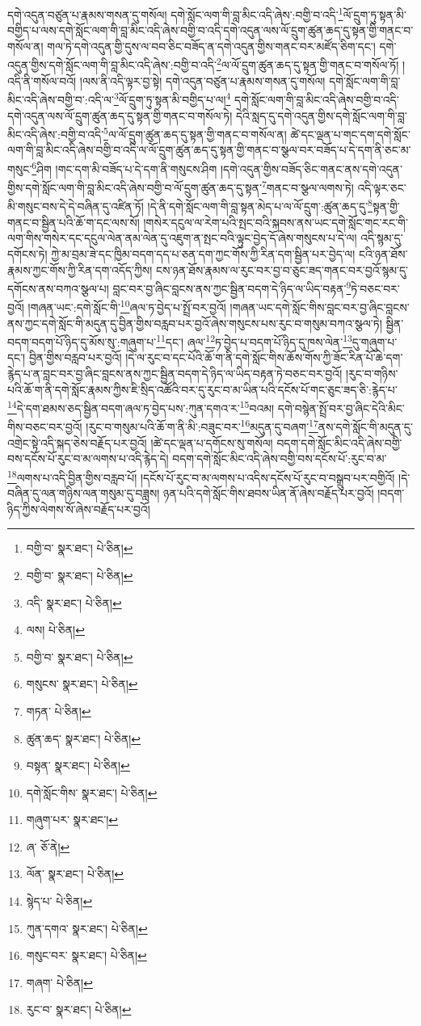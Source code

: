 དགེ་འདུན་བཙུན་པ་རྣམས་གསན་དུ་གསོལ། དགེ་སློང་ལག་གི་བླ་མིང་འདི་ཞེས་:བགྱི་བ་འདི་\footnote{བགྱི་བ་  སྣར་ཐང་།  པེ་ཅིན། }ལོ་དྲུག་ཏུ་སྟན་མི་བགྱིད་པ་ལས་དགེ་སློང་ལག་གི་བླ་མིང་འདི་ཞེས་བགྱི་བ་འདི་དགེ་འདུན་ལས་ལོ་དྲུག་ཚུན་ཆད་དུ་སྟན་གྱི་གནང་བ་གསོལ་ན། གལ་ཏེ་དགེ་འདུན་གྱི་དུས་ལ་བབ་ཅིང་བཟོད་ན་དགེ་འདུན་གྱིས་གནང་བར་མཛོད་ཅིག་དང་། དགེ་འདུན་གྱིས་དགེ་སློང་ལག་གི་བླ་མིང་འདི་ཞེས་:བགྱི་བ་འདི་\footnote{བགྱི་བ་  སྣར་ཐང་།  པེ་ཅིན། }ལ་ལོ་དྲུག་ཚུན་ཆད་དུ་སྟན་གྱི་གནང་བ་གསོལ་ཏོ། །འདི་ནི་གསོལ་བའོ། །ལས་ནི་འདི་ལྟར་བྱ་སྟེ། དགེ་འདུན་བཙུན་པ་རྣམས་གསན་དུ་གསོལ། དགེ་སློང་ལག་གི་བླ་མིང་འདི་ཞེས་བགྱི་བ་:འདི་ལ་\footnote{འདི་  སྣར་ཐང་།  པེ་ཅིན། }ལོ་དྲུག་ཏུ་སྟན་མི་བགྱིད་པ་ལ།\footnote{ལས།  པེ་ཅིན། } དགེ་སློང་ལག་གི་བླ་མིང་འདི་ཞེས་བགྱི་བ་འདི་དགེ་འདུན་ལས་ལོ་དྲུག་ཚུན་ཆད་དུ་སྟན་གྱི་གནང་བ་གསོལ་ཏེ། དེའི་སླད་དུ་དགེ་འདུན་གྱིས་དགེ་སློང་ལག་གི་བླ་མིང་འདི་ཞེས་:བགྱི་བ་འདི་\footnote{བགྱི་བ་  སྣར་ཐང་།  པེ་ཅིན། }ལ་ལོ་དྲུག་ཚུན་ཆད་དུ་སྟན་གྱི་གནང་བ་གསོལ་ན། ཚེ་དང་ལྡན་པ་གང་དག་དགེ་སློང་ལག་གི་བླ་མིང་འདི་ཞེས་བགྱི་བ་འདི་ལ་ལོ་དྲུག་ཚུན་ཆད་དུ་སྟན་གྱི་གནང་བ་སྩལ་བར་བཟོད་པ་དེ་དག་ནི་ཅང་མ་གསུང་\footnote{གསུངས་  སྣར་ཐང་།  པེ་ཅིན། }ཤིག །གང་དག་མི་བཟོད་པ་དེ་དག་ནི་གསུངས་ཤིག །དགེ་འདུན་གྱིས་བཟོད་ཅིང་གནང་ནས་དགེ་འདུན་གྱིས་དགེ་སློང་ལག་གི་བླ་མིང་འདི་ཞེས་བགྱི་བ་ལོ་དྲུག་ཚུན་ཆད་དུ་སྟན་\footnote{གཏན་  པེ་ཅིན། }གནང་བ་སྩལ་ལགས་ཏེ། འདི་ལྟར་ཅང་མི་གསུང་བས་དེ་དེ་བཞིན་དུ་འཛིན་ཏོ། །དེ་ནི་དགེ་སློང་ལག་གི་བླ་སྟན་མེད་པ་ལ་ལོ་དྲུག་:ཚུན་ཆད་དུ་\footnote{ཚུན་ཆད་  སྣར་ཐང་།  པེ་ཅིན། }སྟན་གྱི་གནང་བ་སྦྱིན་པའི་ཆོ་ག་དང་ལས་སོ། །གསེར་དངུལ་ལ་རེག་པའི་སྤང་བའི་སྐབས་ནས་ཡང་དགེ་སློང་གང་རང་གི་ལག་གིས་གསེར་དང་དངུལ་ལེན་ནམ་ལེན་དུ་འཇུག་ན་སྤང་བའི་ལྟུང་བྱེད་དོ་ཞེས་གསུངས་པ་དེ་ལ། འདི་སྙམ་དུ་དགོངས་ཏེ། ཀྱེ་མ་བྲམ་ཟེ་དང་ཁྱིམ་བདག་དད་པ་ཅན་དག་ཀྱང་གོས་ཀྱི་རིན་དག་སྦྱིན་པར་བྱེད་ལ། ངའི་ཉན་ཐོས་རྣམས་ཀྱང་གོས་ཀྱི་རིན་དག་འདོད་ཀྱིས། ངས་ཉན་ཐོས་རྣམས་ལ་རུང་བར་བྱ་བ་ཅུང་ཟད་གནང་བར་བྱའོ་སྙམ་དུ་དགོངས་ནས་བཀའ་སྩལ་པ། བླང་བར་བྱ་ཞིང་བླངས་ནས་ཀྱང་སྦྱིན་བདག་དེ་ཉིད་ལ་ཡིད་བརྟན་\footnote{བསྟན་  སྣར་ཐང་།  པེ་ཅིན། }ཏེ་བཅང་བར་བྱའོ། །གཞན་ཡང་:དགེ་སློང་གི་\footnote{དགེ་སློང་གིས་  སྣར་ཐང་།  པེ་ཅིན། }ཞལ་ཏ་བྱེད་པ་སྤྲོ་བར་བྱའོ། །གཞན་ཡང་དགེ་སློང་གིས་བླང་བར་བྱ་ཞིང་བླངས་ནས་ཀྱང་དགེ་སློང་གི་མདུན་དུ་བྱིན་གྱིས་བརླབ་པར་བྱའོ་ཞེས་གསུངས་པས་རུང་བ་གསུམ་བཀའ་སྩལ་ཏེ། སྦྱིན་བདག་བདག་པོ་ཉིད་དུ་མོས་སུ་:གཞུག་པ་\footnote{གཞུག་པར་  སྣར་ཐང་། }དང་། ཞལ་\footnote{ཞ་  ཅོ་ནེ། }ཏ་བྱེད་པ་བདག་པོ་ཉིད་དུ་ཁས་ལེན་\footnote{ལོན་  སྣར་ཐང་།  པེ་ཅིན། }དུ་གཞུག་པ་དང་། བྱིན་གྱིས་བརླབ་པར་བྱའོ། །དེ་ལ་རུང་བ་དང་པོའི་ཆོ་ག་ནི་དགེ་སློང་གིས་ཆོས་གོས་ཀྱི་ཟོང་རིན་པོ་ཆེ་དག་རྙེད་པ་ན་བླང་བར་བྱ་ཞིང་བླངས་ནས་ཀྱང་སྦྱིན་བདག་དེ་ཉིད་ལ་ཡིད་བརྟན་ཏེ་བཅང་བར་བྱའོ། །རུང་བ་གཉིས་པའི་ཆོ་ག་ནི་དགེ་སློང་རྣམས་ཀྱིས་ཇི་སྲིད་འཚོའི་བར་དུ་རུང་བ་མ་ཡིན་པའི་དངོས་པོ་གང་ཅུང་ཟད་ཅི་:རྙེད་པ་\footnote{སྙེད་པ་  པེ་ཅིན། }དེ་དག་ཐམས་ཅད་སྦྱིན་བདག་ཞལ་ཏ་བྱེད་པས་:ཀུན་དགའ་ར་\footnote{ཀུན་དགའ་  སྣར་ཐང་།  པེ་ཅིན། }བའམ། དགེ་བསྙེན་སྤྲོ་བར་བྱ་ཞིང་དེའི་མིང་གིས་བཅང་བར་བྱའོ། །རུང་བ་གསུམ་པའི་ཆོ་ག་ནི་མི་:བཟུང་བར་\footnote{གསུང་བར་  སྣར་ཐང་།  པེ་ཅིན། }མདུན་དུ་བཞག་\footnote{གཞག་  པེ་ཅིན། }ནས་དགེ་སློང་གི་མདུན་དུ་འགྲེང་སྟེ་འདི་སྐད་ཅེས་བརྗོད་པར་བྱའོ། །ཚེ་དང་ལྡན་པ་དགོངས་སུ་གསོལ། བདག་དགེ་སློང་མིང་འདི་ཞེས་བགྱི་བས་དངོས་པོ་རུང་བ་མ་ལགས་པ་འདི་རྙེད་དེ། བདག་དགེ་སློང་མིང་འདི་ཞེས་བགྱི་བས་དངོས་པོ་:རུང་བ་མ་\footnote{རུང་བ་  སྣར་ཐང་།  པེ་ཅིན། }ལགས་པ་འདི་བྱིན་གྱིས་བརླབ་པོ། །དངོས་པོ་རུང་བ་མ་ལགས་པ་འདིས་དངོས་པོ་རུང་བ་བསྒྲུབ་པར་བགྱིའོ། །དེ་བཞིན་དུ་ལན་གཉིས་ལན་གསུམ་དུ་བཟླས། ཉན་པའི་དགེ་སློང་གིས་ཐབས་ཡིན་ནོ་ཞེས་བརྗོད་པར་བྱའོ། །བདག་ཉིད་ཀྱིས་ལེགས་སོ་ཞེས་བརྗོད་པར་བྱའོ། 